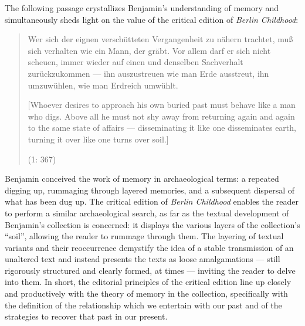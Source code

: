 \begin{review}
The following passage crystallizes Benjamin's understanding of memory
and simultaneously sheds light on the value of the critical edition of
\emph{Berlin Childhood}:

\begin{quote}
Wer sich der eignen verschütteten Vergangenheit zu nähern trachtet, muß
sich verhalten wie ein Mann, der gräbt. Vor allem darf er sich nicht
scheuen, immer wieder auf einen und denselben Sachverhalt zurückzukommen
--- ihn auszustreuen wie man Erde ausstreut, ihn umzuwühlen, wie man
Erdreich umwühlt.

{[}Whoever desires to approach his own buried past must behave like a
man who digs. Above all he must not shy away from returning again and
again to the same state of affairs --- disseminating it like one
disseminates earth, turning it over like one turns over soil.{]}

\begin{flushright}
(1: 367)
\end{flushright}
\end{quote}

\noindent Benjamin conceived the work of memory in archaeological terms: a
repeated digging up, rummaging through layered memories, and a
subsequent dispersal of what has been dug up. The critical edition of
\emph{Berlin Childhood} enables the reader to perform a similar
archaeological search, as far as the textual development of Benjamin's
collection is concerned: it displays the various layers of the
collection's ``soil'', allowing the reader to rummage through them. The
layering of textual variants and their reoccurrence demystify the idea
of a stable transmission of an unaltered text and instead presents the
texts as loose amalgamations --- still rigorously structured and clearly
formed, at times --- inviting the reader to delve into them. In short,
the editorial principles of the critical edition line up closely and
productively with the theory of memory in the collection, specifically
with the definition of the relationship which we entertain with our past
and of the strategies to recover that past in our present.


\end{review}
